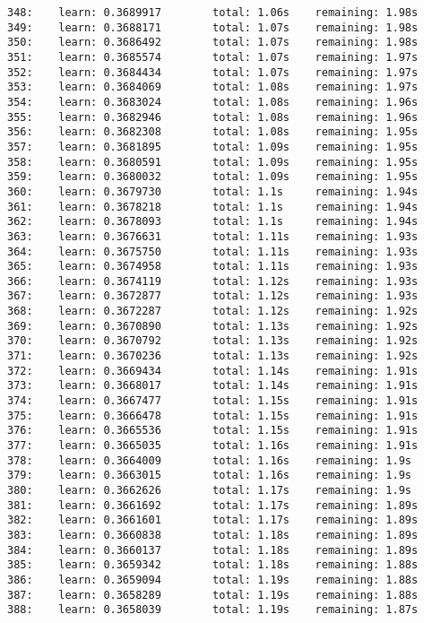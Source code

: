 \documentclass[11pt]{article}
\begin{document}
\begin{Verbatim}[commandchars=\\\{\}]
348:    learn: 0.3689917        total: 1.06s    remaining: 1.98s
349:    learn: 0.3688171        total: 1.07s    remaining: 1.98s
350:    learn: 0.3686492        total: 1.07s    remaining: 1.98s
351:    learn: 0.3685574        total: 1.07s    remaining: 1.97s
352:    learn: 0.3684434        total: 1.07s    remaining: 1.97s
353:    learn: 0.3684069        total: 1.08s    remaining: 1.97s
354:    learn: 0.3683024        total: 1.08s    remaining: 1.96s
355:    learn: 0.3682946        total: 1.08s    remaining: 1.96s
356:    learn: 0.3682308        total: 1.08s    remaining: 1.95s
357:    learn: 0.3681895        total: 1.09s    remaining: 1.95s
358:    learn: 0.3680591        total: 1.09s    remaining: 1.95s
359:    learn: 0.3680032        total: 1.09s    remaining: 1.95s
360:    learn: 0.3679730        total: 1.1s     remaining: 1.94s
361:    learn: 0.3678218        total: 1.1s     remaining: 1.94s
362:    learn: 0.3678093        total: 1.1s     remaining: 1.94s
363:    learn: 0.3676631        total: 1.11s    remaining: 1.93s
364:    learn: 0.3675750        total: 1.11s    remaining: 1.93s
365:    learn: 0.3674958        total: 1.11s    remaining: 1.93s
366:    learn: 0.3674119        total: 1.12s    remaining: 1.93s
367:    learn: 0.3672877        total: 1.12s    remaining: 1.93s
368:    learn: 0.3672287        total: 1.12s    remaining: 1.92s
369:    learn: 0.3670890        total: 1.13s    remaining: 1.92s
370:    learn: 0.3670792        total: 1.13s    remaining: 1.92s
371:    learn: 0.3670236        total: 1.13s    remaining: 1.92s
372:    learn: 0.3669434        total: 1.14s    remaining: 1.91s
373:    learn: 0.3668017        total: 1.14s    remaining: 1.91s
374:    learn: 0.3667477        total: 1.15s    remaining: 1.91s
375:    learn: 0.3666478        total: 1.15s    remaining: 1.91s
376:    learn: 0.3665536        total: 1.15s    remaining: 1.91s
377:    learn: 0.3665035        total: 1.16s    remaining: 1.91s
378:    learn: 0.3664009        total: 1.16s    remaining: 1.9s
379:    learn: 0.3663015        total: 1.16s    remaining: 1.9s
380:    learn: 0.3662626        total: 1.17s    remaining: 1.9s
381:    learn: 0.3661692        total: 1.17s    remaining: 1.89s
382:    learn: 0.3661601        total: 1.17s    remaining: 1.89s
383:    learn: 0.3660838        total: 1.18s    remaining: 1.89s
384:    learn: 0.3660137        total: 1.18s    remaining: 1.89s
385:    learn: 0.3659342        total: 1.18s    remaining: 1.88s
386:    learn: 0.3659094        total: 1.19s    remaining: 1.88s
387:    learn: 0.3658289        total: 1.19s    remaining: 1.88s
388:    learn: 0.3658039        total: 1.19s    remaining: 1.87s

\end{Verbatim}
\end{document}
